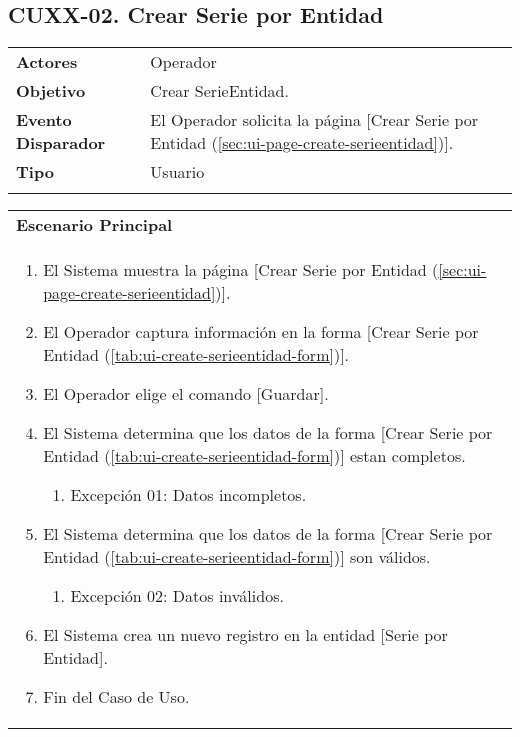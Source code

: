 \clearpage
\subsection{CUXX-02. Crear Serie por Entidad} \label{sec:cu-create-SerieEntidad}

\begin{tabular}{ p{3.5cm} p{11.5cm} }
	\textbf{Actores} & Operador\\
	\textbf{Objetivo} & Crear SerieEntidad.\\
	\textbf{Evento Disparador} & El Operador solicita la página [Crear Serie por Entidad (\ref{sec:ui-page-create-serieentidad})].\\
	\textbf{Tipo} & Usuario\\
	\\
\end{tabular}

\begin{tabular}{ p{15.5cm} }
	\textbf{Escenario Principal} \\
	\begin{enumerate}
		\item El Sistema muestra la página [Crear Serie por Entidad (\ref{sec:ui-page-create-serieentidad})].
		\item El Operador captura información en la forma [Crear Serie por Entidad (\ref{tab:ui-create-serieentidad-form})].
		\item El Operador elige el comando [Guardar].
		\item El Sistema determina que los datos de la forma [Crear Serie por Entidad (\ref{tab:ui-create-serieentidad-form})] estan completos.
			\begin{enumerate}
				\item Excepción 01: Datos incompletos.
			\end{enumerate}
		\item El Sistema determina que los datos de la forma [Crear Serie por Entidad (\ref{tab:ui-create-serieentidad-form})] son válidos.
			\begin{enumerate}
				\item Excepción 02: Datos inválidos.
			\end{enumerate}
		\item El Sistema crea un nuevo registro en la entidad [Serie por Entidad].
		\item Fin del Caso de Uso.
	\end{enumerate}
\end{tabular}

